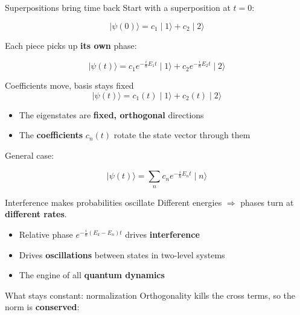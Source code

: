 \documentclass[
  ignorenonframetext,
  aspectratio=169,
  handout]{beamer}
\providecommand{\tightlist}{%
  \setlength{\itemsep}{0pt}\setlength{\parskip}{0pt}}
\begin{document}
\begin{frame}
\begin{block}{Superpositions bring time back}
\protect{}\label{superpositions-bring-time-back}
Start with a superposition at \(t=0\):

\[\mid \psi(0) \rangle = c_1\mid 1 \rangle + c_2 \mid 2 \rangle\]

Each piece picks up \textbf{its own} phase:

\[\mid \psi(t) \rangle = c_1 e^{-\frac{i}{\hbar}E_1 t}\mid 1 \rangle + c_2 e^{-\frac{i}{\hbar}E_2 t}\mid 2 \rangle\]
\end{block}

\begin{block}{Coefficients move, basis stays fixed}
\protect{}\label{coefficients-move-basis-stays-fixed}
\[\mid \psi(t) \rangle = c_1(t)\mid 1\rangle+c_2(t) \mid 2 \rangle\]

\begin{itemize}
\tightlist
\item
  The eigenstates are \textbf{fixed, orthogonal} directions
\item
  The \textbf{coefficients} \(c_n(t)\) rotate the state vector through
  them
\end{itemize}

General case:

\[\mid \psi(t)\rangle = \sum_n c_n e^{-\frac{i}{\hbar}E_n t} \mid n\rangle\]
\end{block}

\begin{block}{Interference makes probabilities oscillate}
\protect{}\label{interference-makes-probabilities-oscillate}
Different energies \(\Rightarrow\) phases turn at \textbf{different
rates}.

\begin{itemize}
\tightlist
\item
  Relative phase \(e^{-\frac{i}{\hbar}(E_k - E_n)t}\) drives
  \textbf{interference}
\item
  Drives \textbf{oscillations} between states in two-level systems
\item
  The engine of all \textbf{quantum dynamics}
\end{itemize}
\end{block}

\begin{block}{What stays constant: normalization}
\protect{}\label{what-stays-constant-normalization}
Orthogonality kills the cross terms, so the norm is \textbf{conserved}:


\end{block}
\end{frame}
\end{document}
